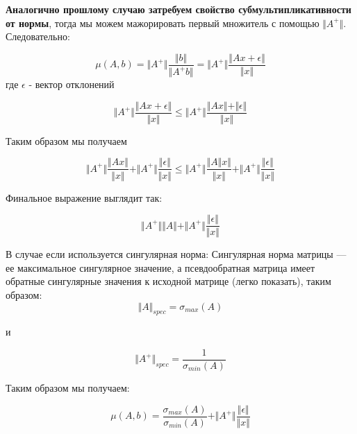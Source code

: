 \documentclass{article}
\begin{document}
    \textbf{Аналогично прошлому случаю затребуем свойство субмультипликативности от нормы}, тогда мы можем мажорировать первый множитель
    с помощью $\Vert A^{+} \Vert$.
    Следовательно:

    \begin{equation}
        \mu(A, b) = \Vert A^{+} \Vert \frac{\Vert b \Vert }{\Vert A^{+} b \Vert} = \Vert A^{+} \Vert \frac{\Vert Ax + \epsilon \Vert }{\Vert x \Vert}
    \end{equation}
    где $\epsilon$ - вектор отклонений

    \begin{equation}
        \Vert A^{+} \Vert \frac{\Vert Ax + \epsilon \Vert }{\Vert x \Vert} \leq \Vert A^{+} \Vert \frac{\Vert Ax \Vert + \Vert \epsilon \Vert }{\Vert x \Vert}
    \end{equation}

    Таким образом мы получаем

    \begin{equation}
        \Vert A^{+} \Vert \frac{\Vert Ax \Vert} {\Vert x \Vert}  + \Vert A^{+} \Vert \frac{ \Vert \epsilon \Vert }{\Vert x \Vert} \leq \Vert A^{+} \Vert \frac{\Vert A \Vert x \Vert} {\Vert x \Vert}  + \Vert A^{+} \Vert \frac{ \Vert \epsilon \Vert }{\Vert x \Vert}
    \end{equation}

    Финальное выражение выглядит так:

    \begin{equation}
        \Vert A^{+} \Vert \Vert A \Vert   + \Vert A^{+} \Vert \frac{ \Vert \epsilon \Vert }{\Vert x \Vert}
    \end{equation}

    В случае если используется сингулярная норма: Сингулярная норма матрицы --- ее максимальное сингулярное значение,
    а псевдообратная матрица имеет обратные сингулярные значения к исходной матрице (легко показать),
    таким образом:
    \begin{equation}
        \Vert A \Vert_{spec} = \sigma_{max}(A)
    \end{equation}

    и

    \begin{equation}
        \Vert A^{+} \Vert_{spec} = \frac{1}{\sigma_{min}(A)}
    \end{equation}

    Таким образом мы получаем:

    \begin{equation}
        \mu(A, b) = \frac{\sigma_{max}(A)}{\sigma_{min}(A)} + \Vert A^{+} \Vert \frac{ \Vert \epsilon \Vert }{\Vert x \Vert}
    \end{equation}
\end{document}
